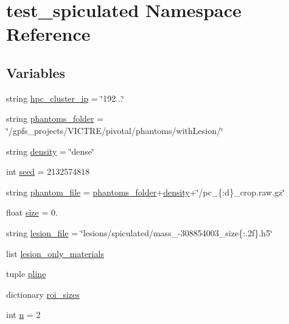 \hypertarget{namespacetest__spiculated}{\section{test\-\_\-spiculated Namespace Reference}
\label{namespacetest__spiculated}
}
\subsection*{Variables}
\begin{DoxyCompactItemize}
\item 
string \hyperlink{namespacetest__spiculated_aff5d6f1f85c625e33f5d9c0781bdcabf}{hpc\-\_\-cluster\-\_\-ip} = \char`\"{}192...\char`\"{}
\item 
string \hyperlink{namespacetest__spiculated_a8e2ee47dc71ed73ef801fe300660add5}{phantoms\-\_\-folder} = \char`\"{}/gpfs\-\_\-projects/V\-I\-C\-T\-R\-E/pivotal/phantoms/with\-Lesion/\char`\"{}
\item 
string \hyperlink{namespacetest__spiculated_a058a57e76535b7d35038bffbda8fda91}{density} = \char`\"{}dense\char`\"{}
\item 
int \hyperlink{namespacetest__spiculated_ae23883f2f949cd553bd4b1df786aefce}{seed} = 2132574818
\item 
string \hyperlink{namespacetest__spiculated_a38dbe89cf6d710045fcb1f252ce6db10}{phantom\-\_\-file} = \hyperlink{namespacetest__spiculated_a8e2ee47dc71ed73ef801fe300660add5}{phantoms\-\_\-folder}+\hyperlink{namespacetest__spiculated_a058a57e76535b7d35038bffbda8fda91}{density}+\char`\"{}/pc\-\_\-\{\-:d\}\-\_\-crop.\-raw.\-gz\char`\"{}
\item 
float \hyperlink{namespacetest__spiculated_a40ff806ed0a1985c23f9ee4d5ee829de}{size} = 0.
\item 
string \hyperlink{namespacetest__spiculated_ac19b4dd28e8af37f75bf2ec1ecb23c62}{lesion\-\_\-file} = \char`\"{}lesions/spiculated/mass\-\_\--\/308854003\-\_\-size\{\-:.\-2f\}.\-h5\char`\"{}
\item 
list \hyperlink{namespacetest__spiculated_ab3f4da20a41fe314d5da3e3ded84fc6f}{lesion\-\_\-only\-\_\-materials}
\item 
tuple \hyperlink{namespacetest__spiculated_a2691d025d2f4ab43907a58fd9bbf3c50}{pline}
\item 
dictionary \hyperlink{namespacetest__spiculated_aee77941f94eca1ddc6507a6dc644320e}{roi\-\_\-sizes}
\item 
int \hyperlink{namespacetest__spiculated_a6d4fc5a3e76208ad33c81d7bffb36de5}{n} = 2
\end{DoxyCompactItemize}


